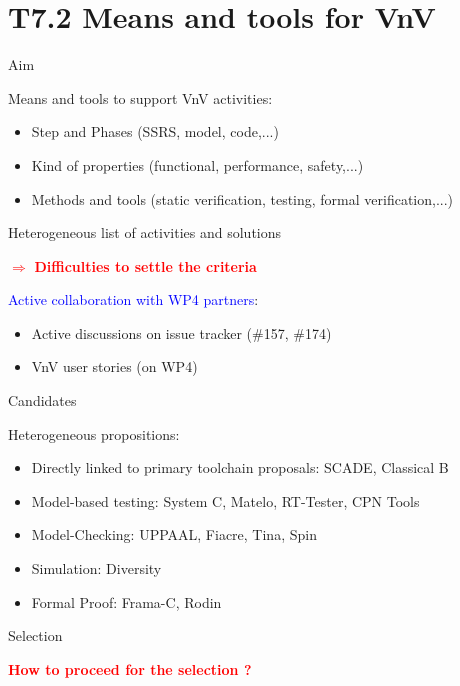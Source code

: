 
\section{T7.2 Means and tools for VnV}


\begin{frame}{Aim}

   Means and tools to support VnV activities:
 
   \begin{itemize}
   \item Step and Phases (SSRS, model, code,...)
   \item Kind of properties (functional, performance, safety,...)
   \item Methods and tools (static verification, testing, formal verification,...)
   \end{itemize}
   
   
   

\pause   
   
Heterogeneous list of activities and solutions
  
  \textcolor{red}{$ \Rightarrow $ \bf{Difficulties to settle the criteria} } 

\pause   
   
   \textcolor{blue}{Active collaboration with WP4 partners}:
   
   
   \begin{itemize}
   \item Active discussions on issue tracker (\#157, \#174)
   \item VnV user stories (on WP4)
   \end{itemize}
  
   
\end{frame}



\begin{frame}{Candidates}

   Heterogeneous propositions:
 
   \begin{itemize}
   \item Directly linked to primary toolchain proposals: SCADE, Classical B
   \item Model-based testing: System C, Matelo, RT-Tester, CPN Tools
   \item Model-Checking: UPPAAL, Fiacre, Tina, Spin
   \item Simulation: Diversity 
   \item Formal Proof: Frama-C, Rodin
   \end{itemize}
   
   
\end{frame}





\begin{frame}{Selection}

   \textbf{\textcolor{red}{How to proceed for the selection ?}}
 
 
   
   
\end{frame}

